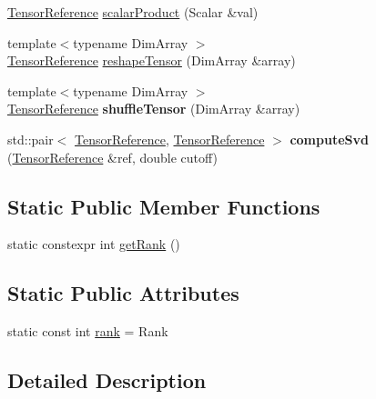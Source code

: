 \begin{DoxyCompactItemize}
\item 
\hyperlink{a00103_a744d7805ef98562de55f32012ab11cfb}{Tensor\+Reference} \hyperlink{a00014_a0c28a71c68f8ba5f07a45421900e8af5}{scalar\+Product} (Scalar \&val)
\item 
{\footnotesize template$<$typename Dim\+Array $>$ }\\\hyperlink{a00103_a744d7805ef98562de55f32012ab11cfb}{Tensor\+Reference} \hyperlink{a00014_adca448f3689d78ea3f4b306904feccb0}{reshape\+Tensor} (Dim\+Array \&array)
\item 
\hypertarget{a00014_a224630f48894240b4e0e0720a505fc1d}{}{\footnotesize template$<$typename Dim\+Array $>$ }\\\hyperlink{a00103_a744d7805ef98562de55f32012ab11cfb}{Tensor\+Reference} {\bfseries shuffle\+Tensor} (Dim\+Array \&array)\label{a00014_a224630f48894240b4e0e0720a505fc1d}

\item 
\hypertarget{a00014_a31efdc5a7e4620e799e5d91ba9d069fd}{}std\+::pair$<$ \hyperlink{a00103_a744d7805ef98562de55f32012ab11cfb}{Tensor\+Reference}, \hyperlink{a00103_a744d7805ef98562de55f32012ab11cfb}{Tensor\+Reference} $>$ {\bfseries compute\+Svd} (\hyperlink{a00103_a744d7805ef98562de55f32012ab11cfb}{Tensor\+Reference} \&ref, double cutoff)\label{a00014_a31efdc5a7e4620e799e5d91ba9d069fd}

\end{DoxyCompactItemize}
\subsection*{Static Public Member Functions}
\begin{DoxyCompactItemize}
\item 
static constexpr int \hyperlink{a00014_a68f0ad7ead91dec2ea56f173981465c8}{get\+Rank} ()
\end{DoxyCompactItemize}
\subsection*{Static Public Attributes}
\begin{DoxyCompactItemize}
\item 
static const int \hyperlink{a00014_ae8f0217985d78dba31d7bdb95ace1e43}{rank} = Rank
\end{DoxyCompactItemize}


\subsection{Detailed Description}
